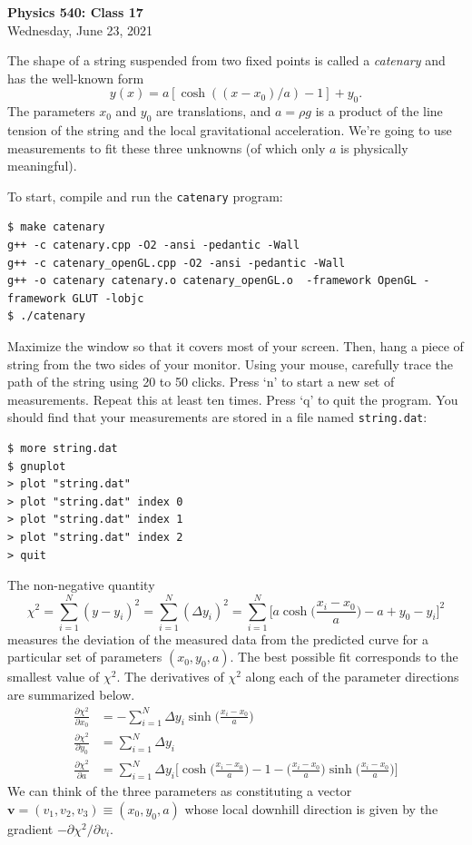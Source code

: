 \documentclass[11pt]{article}
\begin{document}
\begin{center}
{\large\bf Physics 540: Class 17}\\
{\small Wednesday, June 23, 2021}
\end{center}

The shape of a string suspended from two fixed points is called a \emph{catenary} and has the well-known form
\[ y(x) = a[\cosh((x-x_0)/a)-1] + y_0.\] 
The parameters $x_0$ and $y_0$ are translations, and $a = \rho g$ is a product of the line tension of the string
and the local gravitational acceleration. We're going to use measurements to fit these three unknowns (of which
only $a$ is physically meaningful).

To start, compile and run the \verb!catenary! program:
{\small\begin{verbatim}
$ make catenary
g++ -c catenary.cpp -O2 -ansi -pedantic -Wall
g++ -c catenary_openGL.cpp -O2 -ansi -pedantic -Wall
g++ -o catenary catenary.o catenary_openGL.o  -framework OpenGL -framework GLUT -lobjc
$ ./catenary
\end{verbatim}}
Maximize the window so that it covers most of your screen. Then, hang a piece of string from the two sides of your monitor. 
Using your mouse, carefully trace the path of the string using 20 to 50 clicks. Press `n' to start a new set of measurements.
Repeat this at least ten times. Press `q' to quit the program. You should find that your measurements are stored
in a file named \verb!string.dat!:
{\small\begin{verbatim}
$ more string.dat
$ gnuplot
> plot "string.dat"
> plot "string.dat" index 0
> plot "string.dat" index 1
> plot "string.dat" index 2
> quit
\end{verbatim}}

The non-negative quantity
 \[ \chi^2 = \sum_{i=1}^N (y-y_i)^2 =  \sum_{i=1}^N (\Delta y_i)^2 = \sum_{i=1}^N \biggl[a \cosh\biggl(\frac{x_i-x_0}{a}\biggr)-a + y_0-y_i\biggr]^2 
 \] 
 measures the deviation of the measured data from the predicted curve for a particular set of parameters $(x_0,y_0,a)$.
 The best possible fit corresponds to the smallest value of $\chi^2$. 
 The derivatives of $\chi^2$ along each of the parameter directions are summarized below.  
 \begin{align*}
 \frac{\partial\chi^2}{\partial x_0} &= -\sum_{i=1}^N \Delta y_i \sinh\biggl(\frac{x_i-x_0}{a}\biggr)\\
 \frac{\partial\chi^2}{ \partial y_0} &= \sum_{i=1}^N \Delta y_i\\
 \frac{\partial \chi^2}{\partial a} &= \sum_{i=1}^N \Delta y_i \biggl[ \cosh\biggl(\frac{x_i-x_0}{a}\biggr) - 1 - \biggl(\frac{x_i-x_0}{a}\biggr) \sinh\biggl(\frac{x_i-x_0}{a}\biggr) \biggr]
 \end{align*}
We can think of the three parameters as constituting a vector 
$\mathbf{v} = (v_1, v_2, v_3) \equiv (x_0, y_0, a)$ whose local downhill direction is given by the gradient
$-\partial \chi^2/\partial v_i$. 
\end{document}
